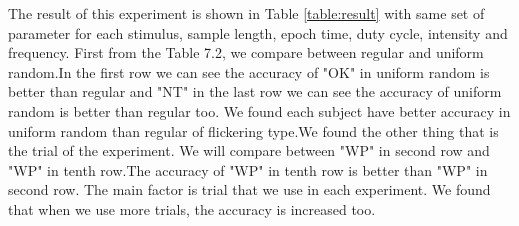 \begin{table}[ht]
\centering
{}
\caption{Experiment result}
\label{table:result}
\end{table}

The result of this experiment is shown in Table \ref{table:result} with same set of parameter for each stimulus, sample length, epoch time, duty cycle, intensity and frequency. First from the Table 7.2, we compare between regular and uniform random.In the first row we can see the accuracy of "OK" in uniform random is better than regular and "NT" in the last row we can see the accuracy of uniform random is better than regular too. We found each subject have better accuracy in uniform random than regular of flickering type.We found the other thing that is the trial of the experiment. We will compare between "WP" in second row and "WP" in tenth row.The accuracy of "WP" in tenth row is better than "WP" in second row. The main factor is trial that we use in each experiment. We found that when we use more trials, the accuracy is increased too.

